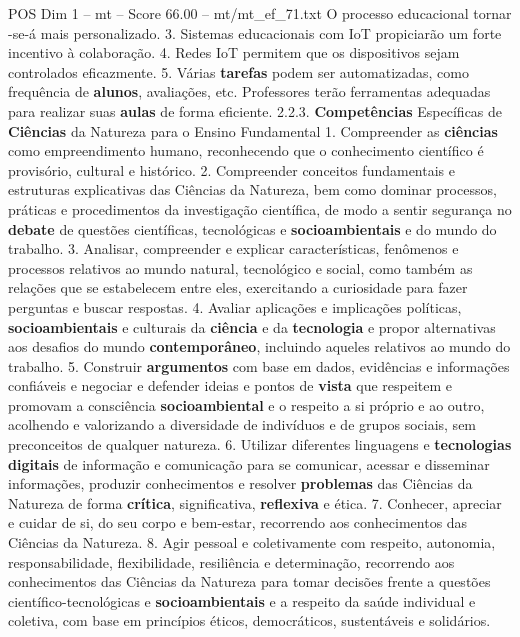 \begin{textsample}{POS Dim 1 – mt – Score 66.00 – mt/mt\_ef\_71.txt}
O processo educacional tornar -se-á mais personalizado. 3.
Sistemas educacionais com IoT propiciarão um forte incentivo à colaboração. 4.
Redes IoT permitem que os dispositivos sejam controlados eficazmente. 5.
Várias \textbf{tarefas} podem ser automatizadas, como frequência de \textbf{alunos}, avaliações, etc.
Professores terão ferramentas adequadas para realizar suas \textbf{aulas} de forma eficiente. 2.2.3. \textbf{Competências} Específicas de \textbf{Ciências} da Natureza para o Ensino Fundamental 1.
Compreender as \textbf{ciências} como empreendimento humano, reconhecendo que o conhecimento científico é provisório, cultural e histórico. 2.
Compreender conceitos fundamentais e estruturas explicativas das Ciências da Natureza, bem como dominar processos, práticas e procedimentos da investigação científica, de modo a sentir segurança no \textbf{debate} de questões científicas, tecnológicas e \textbf{socioambientais} e do mundo do trabalho. 3.
Analisar, compreender e explicar características, fenômenos e processos relativos ao mundo natural, tecnológico e social, como também as relações que se estabelecem entre eles, exercitando a curiosidade para fazer perguntas e buscar respostas. 4.
Avaliar aplicações e implicações políticas, \textbf{socioambientais} e culturais da \textbf{ciência} e da \textbf{tecnologia} e propor alternativas aos desafios do mundo \textbf{contemporâneo}, incluindo aqueles relativos ao mundo do trabalho. 5.
Construir \textbf{argumentos} com base em dados, evidências e informações confiáveis e negociar e defender ideias e pontos de \textbf{vista} que respeitem e promovam a consciência \textbf{socioambiental} e o respeito a si próprio e ao outro, acolhendo e valorizando a diversidade de indivíduos e de grupos sociais, sem preconceitos de qualquer natureza. 6.
Utilizar diferentes linguagens e \textbf{tecnologias} \textbf{digitais} de informação e comunicação para se comunicar, acessar e disseminar informações, produzir conhecimentos e resolver \textbf{problemas} das Ciências da Natureza de forma \textbf{crítica}, significativa, \textbf{reflexiva} e ética. 7.
Conhecer, apreciar e cuidar de si, do seu corpo e bem-estar, recorrendo aos conhecimentos das Ciências da Natureza. 8.
Agir pessoal e coletivamente com respeito, autonomia, responsabilidade, flexibilidade, resiliência e determinação, recorrendo aos conhecimentos das Ciências da Natureza para tomar decisões frente a questões científico-tecnológicas e \textbf{socioambientais} e a respeito da saúde individual e coletiva, com base em princípios éticos, democráticos, sustentáveis e solidários.


\end{textsample}
